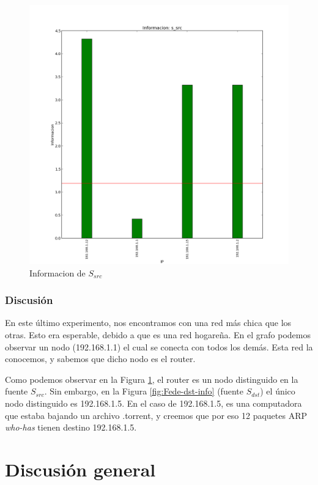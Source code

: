 \documentclass[10pt, a4paper]{article}
\begin{document}
\begin{figure}[H]
\begin{minipage}{0.5\linewidth}
    \includegraphics[width=\linewidth]{../imgs/pruebaFede-ips_s_src_info.png}
    \caption{Informacion de $S_{src}$}\label{fig:Fede-src-info}
  \end{minipage}
\end{figure}

\subsubsection{Discusión}

En este último experimento, nos encontramos con una red más chica que los otras. Esto era esperable, debido a que es una red hogareña. En el grafo podemos observar un nodo (192.168.1.1) el cual se conecta con todos los demás. Esta red la conocemos, y sabemos que dicho nodo es el router.

Como podemos observar en la Figura \ref{fig:Fede-src-info}, el router es un nodo distinguido en la fuente $S_{src}$. Sin embargo, en la Figura \ref{fig:Fede-dst-info} (fuente $S_{dst}$) el único nodo distinguido es 192.168.1.5. En el caso de 192.168.1.5, es una computadora que estaba bajando un archivo .torrent, y creemos que por eso 12 paquetes ARP \emph{who-has} tienen destino 192.168.1.5.

\section{Discusión general}
\end{document}
